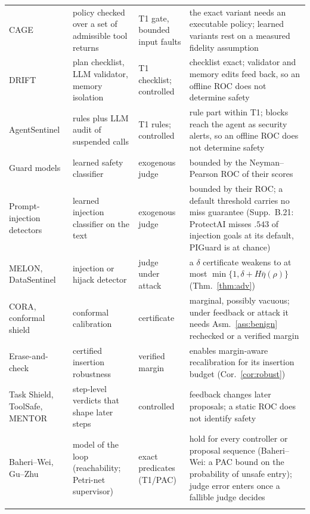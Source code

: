 \begin{table}[t]
\begin{tabularx}{\textwidth}{@{}>{\raggedright\arraybackslash}p{}>{\raggedright\arraybackslash}p{}>{\raggedright\arraybackslash}p{}>{\raggedright\arraybackslash}X@{}}
\addlinespace[2pt]
CAGE \citep{delattre2026cage}
  & policy checked over a set of admissible tool returns & T1 gate, bounded input faults
  & the exact variant needs an executable policy; learned variants rest on a measured fidelity assumption \\
\addlinespace[2pt]
DRIFT \citep{li2025drift}
  & plan checklist, LLM validator, memory isolation & T1 checklist; controlled
  & checklist exact; validator and memory edits feed back, so an offline ROC does not determine safety \\
\addlinespace[2pt]
AgentSentinel \citep{hu2025agentsentinel}
  & rules plus LLM audit of suspended calls & T1 rules; controlled
  & rule part within T1; blocks reach the agent as security alerts, so an offline ROC does not determine safety \\
\addlinespace[2pt]
Guard models \citep{inan2023llamaguard,han2024wildguard,liu2026agentdog}
  & learned safety classifier & exogenous judge
  & bounded by the Neyman--Pearson ROC of their scores \\
\addlinespace[2pt]
Prompt-injection detectors \citep{protectai2024deberta,li2025piguard,chennabasappa2025llamafirewall}
  & learned injection classifier on the text & exogenous judge
  & bounded by their ROC; a default threshold carries no miss guarantee (Supp.~B.21: ProtectAI misses $.543$ of injection goals at its default, PIGuard is at chance) \\
\addlinespace[2pt]
MELON, DataSentinel \citep{zhu2025melon,liu2025datasentinel}
  & injection or hijack detector & judge under attack
  & a $\delta$ certificate weakens to at most $\min\{1,\delta+H\bar\eta(\rho)\}$ (Thm.~\ref{thm:adv}) \\
\addlinespace[2pt]
CORA, conformal shield \citep{feng2026cora,scarbro2025conformal}
  & conformal calibration & certificate
  & marginal, possibly vacuous; under feedback or attack it needs Asm.~\ref{ass:benign} rechecked or a verified margin \\
\addlinespace[2pt]
Erase-and-check \citep{kumar2024certifying}
  & certified insertion robustness & verified margin
  & enables margin-aware recalibration for its insertion budget (Cor.~\ref{cor:robust}) \\
\addlinespace[2pt]
Task Shield, ToolSafe, MENTOR \citep{jia2025taskshield,mou2026toolsafe,anand2026mentor}
  & step-level verdicts that shape later steps & controlled
  & feedback changes later proposals; a static ROC does not identify safety \\
\addlinespace[2pt]
Baheri--Wei, Gu--Zhu \citep{baheri2026controller,gu2026certified}
  & model of the loop (reachability; Petri-net supervisor) & exact predicates (T1/PAC)
  & hold for every controller or proposal sequence (Baheri--Wei: a PAC bound on the probability of unsafe entry); judge error enters once a fallible judge decides \\
\addlinespace[2pt]
\bottomrule
\end{tabularx}
\end{table}

